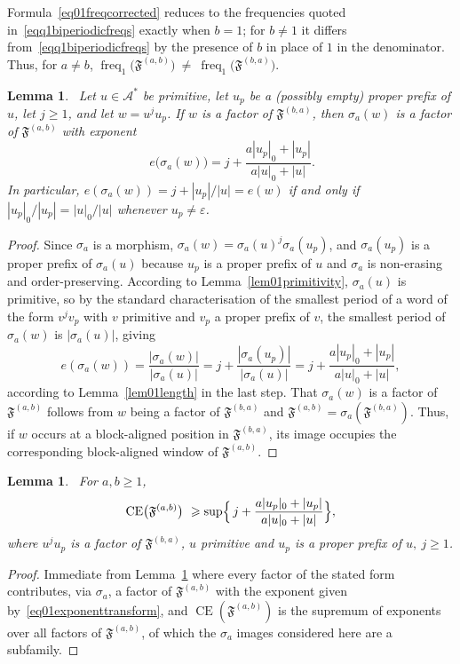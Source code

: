 \documentclass[12pt]{amsart}
\theoremstyle{plain}
\newtheorem{lemma}[theorem]{Lemma}
\theoremstyle{definition}
\theoremstyle{remark}
\newcommand{\CE}{\operatorname{CE}}
\newcommand{\AlphA}{\mathcal{A}}
\newcommand{\FD}{\mathfrak{F}}
\begin{document}
\medskip

Formula~\eqref{eq01freqcorrected} reduces to the frequencies quoted
in~\eqref{eqq1biperiodicfreqs} exactly when $b=1$; for $b\ne1$ it
differs from~\eqref{eqq1biperiodicfreqs} by the presence of $b$ in
place of $1$ in the denominator. Thus, for $a\ne b$, $\operatorname{freq}_1\bigl(\FD^{(a,b)}\bigr)\ \ne\ \operatorname{freq}_1\bigl(\FD^{(b,a)}\bigr).$

\begin{lemma}~\label{lem02exponenttransform}
Let $u\in\AlphA^{*}$ be primitive, let $u_p$ be a (possibly empty) proper
prefix of $u$, let $j\geqslant 1$, and let $w=u^ju_p$. If $w$ is a factor of
$\FD^{(b,a)}$, then $\sigma_a(w)$ is a factor of $\FD^{(a,b)}$ with exponent
\begin{equation}~\label{eq01exponenttransform}
  e\bigl(\sigma_a(w)\bigr) = j + \frac{a|u_p|_0+|u_p|}{a|u|_0+|u|}.
\end{equation}
In particular, $e(\sigma_a(w)) = j+|u_p|/|u| = e(w)$ if and only if
$|u_p|_0/|u_p| = |u|_0/|u|$ whenever $u_p\ne\varepsilon$.
\end{lemma}
\begin{proof}
Since $\sigma_a$ is a morphism, $\sigma_a(w)=\sigma_a(u)^j\sigma_a(u_p)$,
and $\sigma_a(u_p)$ is a proper prefix of $\sigma_a(u)$ because $u_p$ is
a proper prefix of $u$ and $\sigma_a$ is non-erasing and
order-preserving. According to Lemma~\ref{lem01primitivity}, $\sigma_a(u)$ is
primitive, so by the standard characterisation of the smallest period
of a word of the form $v^jv_p$ with $v$ primitive and $v_p$ a proper
prefix of $v$, the smallest
period of $\sigma_a(w)$ is $|\sigma_a(u)|$, giving
\[
  e(\sigma_a(w)) = \frac{|\sigma_a(w)|}{|\sigma_a(u)|}
  = j + \frac{|\sigma_a(u_p)|}{|\sigma_a(u)|}
  = j + \frac{a|u_p|_0+|u_p|}{a|u|_0+|u|},
\]
according to Lemma~\ref{lem01length} in the last step. That $\sigma_a(w)$ is a
factor of $\FD^{(a,b)}$ follows from $w$ being a factor of $\FD^{(b,a)}$ and
$\FD^{(a,b)}=\sigma_a(\FD^{(b,a)})$. Thus, if $w$ occurs
at a block-aligned position in $\FD^{(b,a)}$, its image occupies the
corresponding block-aligned window of $\FD^{(a,b)}$.
\end{proof}

\begin{lemma}~\label{prop01celowerbound}
For $a,b \geqslant 1$, 
\[
  \CE\bigl(\FD^{(a,b)}\bigr) \ \geqslant
  \sup\Bigl\{\, j + \frac{a|u_p|_0+|u_p|}{a|u|_0+|u|}  \Bigr\},
\]
where $u^ju_p$ is a factor of $\FD^{(b,a)}$, $u$ primitive and $u_p$ is a proper prefix of $u,\ j\geqslant 1$. 
\end{lemma}
\begin{proof}
Immediate from Lemma~\ref{lem02exponenttransform} where every factor of the
stated form contributes, via $\sigma_a$, a factor of $\FD^{(a,b)}$ with
the exponent given by~\eqref{eq01exponenttransform}, and $\CE(\FD^{(a,b)})$
is the supremum of exponents over all factors of $\FD^{(a,b)}$, of
which the $\sigma_a$ images considered here are a subfamily.
\end{proof}
\end{document}
